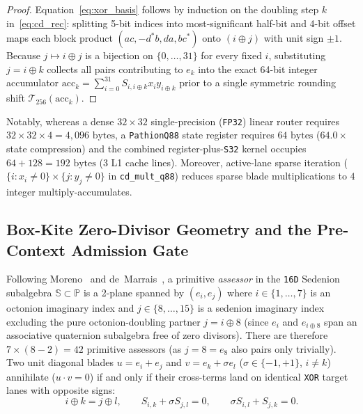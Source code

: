 \documentclass[11pt]{article}
\theoremstyle{plain}
\theoremstyle{definition}
\begin{document}
\begin{proof}
Equation~\eqref{eq:xor_basis} follows by induction on the doubling step $k$ in~\eqref{eq:cd_rec}: splitting 5-bit indices into most-significant half-bit and 4-bit offset maps each block product $(ac, -d^*b, da, bc^*)$ onto $(i \oplus j)$ with unit sign $\pm 1$. Because $j \mapsto i \oplus j$ is a bijection on $\{0,\dots,31\}$ for every fixed $i$, substituting $j = i \oplus k$ collects all pairs contributing to $e_k$ into the exact 64-bit integer accumulator $\mathrm{acc}_k = \sum_{i=0}^{31} S_{i, i \oplus k} x_i y_{i \oplus k}$ prior to a single symmetric rounding shift $\mathcal{T}_{256}(\mathrm{acc}_k)$.
\end{proof}

Notably, whereas a dense $32 \times 32$ single-precision (\texttt{FP32}) linear router requires $32 \times 32 \times 4 = 4{,}096\text{ bytes}$, a \texttt{PathionQ88} state register requires $64\text{ bytes}$ ($64.0\times$ state compression) and the combined register-plus-\texttt{S32} kernel occupies $64 + 128 = 192\text{ bytes}$ ($3$ L1 cache lines). Moreover, active-lane sparse iteration ($\{i : x_i \neq 0\} \times \{j : y_j \neq 0\}$ in \texttt{cd\_mult\_q88}) reduces sparse blade multiplications to $4$ integer multiply-accumulates.

\subsection{Box-Kite Zero-Divisor Geometry and the Pre-Context Admission Gate}

Following Moreno~\cite{moreno1998} and de~Marrais~\cite{demarrais2000,demarrais2002}, a primitive \emph{assessor} in the \texttt{16D} Sedenion subalgebra $\mathbb{S} \subset \mathbb{P}$ is a 2-plane spanned by $(e_i, e_j)$ where $i \in \{1,\dots,7\}$ is an octonion imaginary index and $j \in \{8,\dots,15\}$ is a sedenion imaginary index excluding the pure octonion-doubling partner $j = i \oplus 8$ (since $e_i$ and $e_{i \oplus 8}$ span an associative quaternion subalgebra free of zero divisors). There are therefore $7 \times (8 - 2) = 42$ primitive assessors (as $j = 8 = e_8$ also pairs only trivially). Two unit diagonal blades $u = e_i + e_j$ and $v = e_k + \sigma e_l$ ($\sigma \in \{-1, +1\}$, $i \neq k$) annihilate ($u \cdot v = 0$) if and only if their cross-terms land on identical \texttt{XOR} target lanes with opposite signs:
\begin{equation}\label{eq:zd_cond}
  i \oplus k = j \oplus l, \qquad S_{i,k} + \sigma S_{j,l} = 0, \qquad \sigma S_{i,l} + S_{j,k} = 0.
\end{equation}
\end{document}
